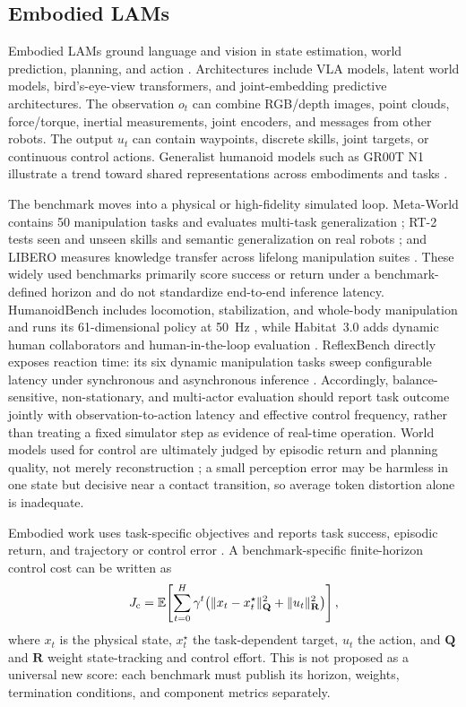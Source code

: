 \documentclass[letterpaper,journal]{IEEEtran}
\begin{document}
\subsection{Embodied LAMs}
Embodied LAMs ground language and vision in state estimation, world
prediction, planning, and action \cite{palme,rt2,dreamer3}. Architectures
include VLA models, latent
world models, bird's-eye-view transformers, and joint-embedding predictive
architectures. The observation $o_t$ can combine RGB/depth images, point
clouds, force/torque, inertial measurements, joint encoders, and messages from
other robots. The output $u_t$ can contain waypoints, discrete skills, joint
targets, or continuous control actions. Generalist humanoid models such as
GR00T N1 illustrate a trend toward shared representations across embodiments
and tasks \cite{groot}.

The benchmark moves into a physical or high-fidelity simulated loop.
Meta-World contains 50 manipulation tasks and evaluates multi-task
generalization \cite{metaworld}; RT-2 tests seen and unseen skills and semantic
generalization on real robots \cite{rt2}; and LIBERO measures knowledge
transfer across lifelong manipulation suites \cite{libero}. These widely used
benchmarks primarily score success or return under a benchmark-defined horizon
and do not standardize end-to-end inference latency. HumanoidBench includes
locomotion, stabilization, and whole-body manipulation and runs its
61-dimensional policy at 50~Hz \cite{humanoidbench}, while Habitat~3.0 adds
dynamic human collaborators and human-in-the-loop evaluation
\cite{habitat3}. ReflexBench directly exposes reaction time: its six dynamic
manipulation tasks sweep configurable latency under synchronous and
asynchronous inference \cite{reflexbench}. Accordingly, balance-sensitive,
non-stationary, and multi-actor evaluation should report task outcome jointly
with observation-to-action latency and effective control frequency, rather
than treating a fixed simulator step as evidence of real-time operation.
World models used for control are ultimately judged by episodic return and
planning quality, not merely reconstruction \cite{dreamer3}; a small
perception error may be harmless in one state but decisive near a contact
transition, so average token distortion alone is inadequate.

Embodied work uses task-specific objectives and reports task success, episodic
return, and trajectory or control error \cite{rt2,dreamer3,humanoidbench}. A
benchmark-specific finite-horizon control cost can be written as
\begin{equation}
J_{\rm c}=\mathbb{E}\!\left[\sum_{t=0}^{H}
\gamma^t\!\left(
\|x_t-x_t^\star\|_{\mathbf Q}^{2}
+\|u_t\|_{\mathbf R}^{2}
\right)\right],
\label{eq:control_cost}
\end{equation}
where $x_t$ is the physical state, $x_t^\star$ the task-dependent target,
$u_t$ the action, and $\mathbf Q$ and $\mathbf R$ weight state-tracking and
control effort. This is not proposed as a universal new score: each benchmark
must publish its horizon, weights, termination conditions, and component
metrics separately.
\end{document}
